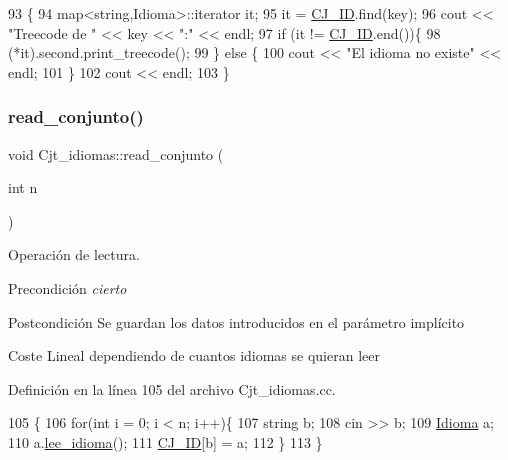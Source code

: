 \begin{DoxyCode}
93                                              \{
94   map<string,Idioma>::iterator it;
95   it = \hyperlink{class_cjt__idiomas_aeb67a7100b1345a160fb85466bd4e5f6}{CJ\_ID}.find(key);
96   cout << \textcolor{stringliteral}{"Treecode de "} << key << \textcolor{stringliteral}{":"} << endl;
97   \textcolor{keywordflow}{if} (it != \hyperlink{class_cjt__idiomas_aeb67a7100b1345a160fb85466bd4e5f6}{CJ\_ID}.end())\{
98     (*it).second.print\_treecode();
99   \} \textcolor{keywordflow}{else} \{
100     cout << \textcolor{stringliteral}{"El idioma no existe"} << endl;
101   \}
102   cout << endl;
103 \}
\end{DoxyCode}
\mbox{\label{class_cjt__idiomas_a09e45083b9df57c02f05bda0bef3d0d3}} 
\subsubsection{\texorpdfstring{read\+\_\+conjunto()}{read\_conjunto()}}
{\footnotesize\ttfamily void Cjt\+\_\+idiomas\+::read\+\_\+conjunto (\begin{DoxyParamCaption}\item[{int}]{n }\end{DoxyParamCaption})}



Operación de lectura. 

\begin{DoxyPrecond}{Precondición}
{\itshape cierto} 
\end{DoxyPrecond}
\begin{DoxyPostcond}{Postcondición}
Se guardan los datos introducidos en el parámetro implícito 
\end{DoxyPostcond}
\begin{DoxyParagraph}{Coste}
Lineal dependiendo de cuantos idiomas se quieran leer 
\end{DoxyParagraph}


Definición en la línea 105 del archivo Cjt\+\_\+idiomas.\+cc.


\begin{DoxyCode}
105                                     \{
106   \textcolor{keywordflow}{for}(\textcolor{keywordtype}{int} i = 0; i < n; i++)\{
107     \textcolor{keywordtype}{string} b;
108     cin >> b;
109     \hyperlink{class_idioma}{Idioma} a;
110     a.\hyperlink{class_idioma_a0a4599da90aef15aa798a63ee6ad820e}{lee\_idioma}();
111     \hyperlink{class_cjt__idiomas_aeb67a7100b1345a160fb85466bd4e5f6}{CJ\_ID}[b] = a;
112   \}
113 \}
\end{DoxyCode}


